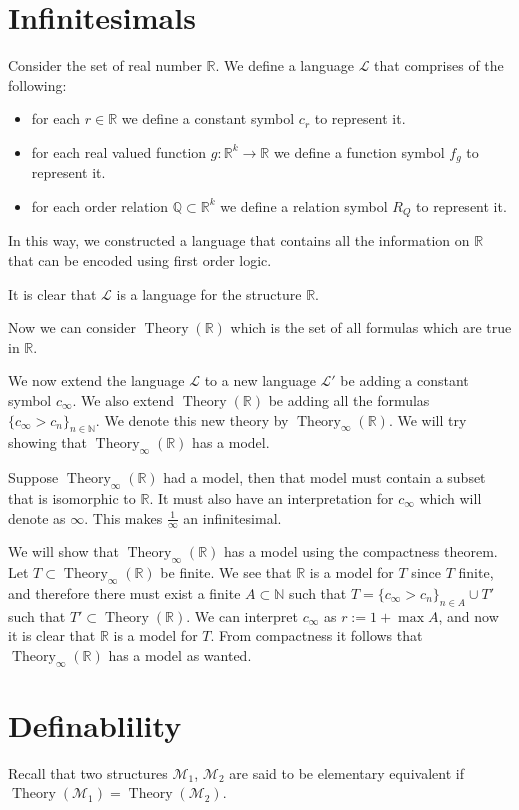 \documentclass[11pt,a4paper]{article}
\theoremstyle{definition}
\theoremstyle{plain}
\DeclareMathOperator{\Theory}{Theory}
\newcommand{\N}{\mathbb{N}}
\newcommand{\Q}{\mathbb{Q}}
\newcommand{\R}{\mathbb{R}}
\newcommand{\M}{\mathcal{M}}
\renewcommand{\L}{\mathcal{L}}
\begin{document}
  \section{Infinitesimals}
  Consider the set of real number $\R$.
  We define a language $\L$ that comprises of the following:
  \begin{itemize}
    \item for each $r \in \R$ we define a constant symbol $c_r$ to
      represent it.
    \item for each real valued function $g \colon \R^k \to \R$ we define
      a function symbol $f_g$ to represent it.
    \item for each order relation $\Q \subset \R^k$ we define a relation
      symbol $R_Q$ to represent it.
  \end{itemize}
  
  In this way, we constructed a language that contains all the information
  on $\R$ that can be encoded using first order logic.

  It is clear that $\L$ is a language for the structure $\R$.

  Now we can consider $\Theory(\R)$ which is the set of all formulas
  which are true in $\R$.

  We now extend the language $\L$ to a new language $\L'$ be adding
  a constant symbol $c_\infty$. We also extend $\Theory(\R)$ be adding
  all the formulas $\{c_\infty > c_n\}_{n \in \N}$. We denote this
  new theory by $\Theory_\infty(\R)$. We will try showing that 
  $\Theory_\infty(\R)$ has a model.

  Suppose $\Theory_\infty(\R)$ had a model, then that model must contain
  a subset that is isomorphic to $\R$.
  It must also have an interpretation for $c_\infty$ which will denote 
  as $\infty$.
  This makes $\frac{1}{\infty}$ an infinitesimal.

  We will show that $\Theory_\infty(\R)$ has a model using the compactness
  theorem.
  Let $T \subset \Theory_\infty(\R)$ be finite.
  We see that $\R$ is a model for $T$ since $T$ finite,
  and therefore there must exist a finite $A \subset \N$ such that
  $T = \{c_\infty > c_n\}_{n \in A} \cup T'$ such that 
  $T' \subset \Theory(\R)$.
  We can interpret $c_\infty$ as $r := 1 + \max A$, and now it is
  clear that $\R$ is a model for $T$.
  From compactness it follows that $\Theory_\infty(\R)$ has a model
  as wanted.

  \section{Definablility}
  Recall that two structures $\M_1$, $\M_2$ are said to be elementary 
  equivalent if $\Theory(\M_1) = \Theory(\M_2)$.
\end{document}
